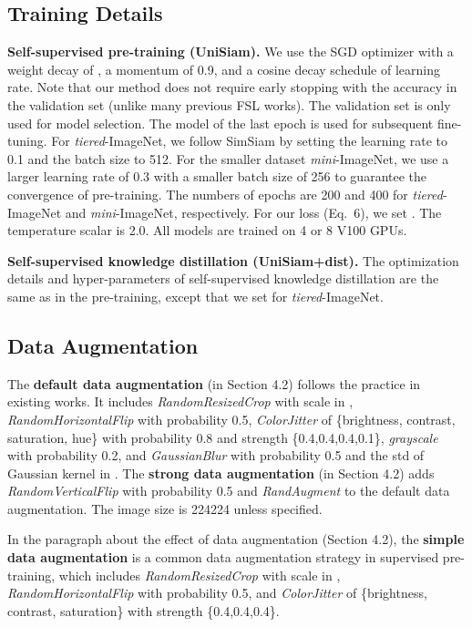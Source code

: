 \documentclass[runningheads]{llncs}
\begin{document}
\subsection{Training Details}
\textbf{Self-supervised pre-training (UniSiam).}
We use the SGD optimizer with a weight decay of , a momentum of 0.9, and a cosine decay schedule of learning rate. 
Note that our method does not require early stopping with the accuracy in the validation set (unlike many previous FSL works).
The validation set is only used for model selection.
The model of the last epoch is used for subsequent fine-tuning.
For \emph{tiered}-ImageNet, we follow SimSiam by setting the learning rate to 0.1 and the batch size to 512. 
For the smaller dataset \emph{mini}-ImageNet, we use a larger learning rate of 0.3 with a smaller batch size of 256 to guarantee the convergence of pre-training.
The numbers of epochs are 200 and 400 for \emph{tiered}-ImageNet and \emph{mini}-ImageNet, respectively.
For our loss  (Eq.~6), we set . The temperature scalar  is 2.0. All models are trained on 4 or 8 V100 GPUs.



\textbf{Self-supervised knowledge distillation (UniSiam+dist).} The optimization details and hyper-parameters of self-supervised knowledge distillation are the same as in the pre-training, except that we set  for \emph{tiered}-ImageNet.


\subsection{Data Augmentation}
The \textbf{default data augmentation} (in Section 4.2) follows the practice in existing works. It includes \textit{RandomResizedCrop} with scale in , \textit{RandomHorizontalFlip} with probability 0.5, \textit{ColorJitter} \cite{wu2018unsupervised} of \{brightness, contrast, saturation, hue\} with  probability 0.8 and strength \{0.4,0.4,0.4,0.1\}, \textit{grayscale} with  probability 0.2, and \textit{GaussianBlur} with probability 0.5 and the std of Gaussian kernel in . The \textbf{strong data augmentation} (in Section 4.2) adds \textit{RandomVerticalFlip} with probability 0.5 and \textit{RandAugment} \cite{cubuk2020randaugment} to the default data augmentation. The image size is 224224 unless specified.

In the paragraph about the effect of data augmentation (Section 4.2), the \textbf{simple data augmentation} is a common data augmentation strategy in supervised pre-training, which includes \textit{RandomResizedCrop} with scale in , \textit{RandomHorizontalFlip} with probability 0.5, and \textit{ColorJitter} of \{brightness, contrast, saturation\} with strength \{0.4,0.4,0.4\}.
\end{document}
